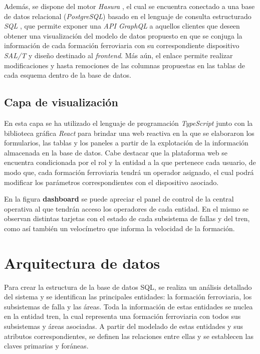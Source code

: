 Además, se dispone del motor \textit{Hasura} \cite{b16}, el cual se encuentra conectado a una base de datos relacional (\textit{PostgreSQL}) basado en el lenguaje de consulta estructurado \textit{SQL} \cite{b17}, que permite exponer una \textit{API GraphQL} \cite{b18} a aquellos clientes que deseen obtener una visualización del modelo de datos propuesto en que se conjuga la información de cada formación ferroviaria con su correspondiente dispositivo \textit{SAL/T} y diseño destinado al \textit{frontend}. Más aún, el enlace permite realizar modificaciones y hasta remociones de las columnas propuestas en las tablas de cada esquema dentro de la base de datos.


\subsection{Capa de visualización}

En esta capa se ha utilizado el lenguaje de programación \textit{TypeScript} \cite{b19} junto con la biblioteca gráfica \textit{React} \cite{b20} para brindar una web reactiva en la que se elaboraron los formularios, las tablas y los paneles a partir de la explotación de la información almacenada en la base de datos. Cabe destacar que la plataforma web se encuentra condicionada por el rol y la entidad a la que pertenece cada usuario, de modo que, cada formación ferroviaria tendrá un operador asignado, el cual podrá modificar los parámetros correspondientes con el dispositivo asociado.

En la figura \textbf{dashboard} se puede apreciar el panel de control de la central operativa al que tendrán acceso los operadores de cada entidad.
En el mismo se observan distintas tarjetas con el estado de cada subsistema de fallas y del tren, como así también un velocímetro que informa la velocidad de la formación.


\section{Arquitectura de datos}

Para crear la estructura de la base de datos SQL, se realiza un análisis detallado del sistema y se identifican las principales entidades: la formación ferroviaria, los subsistemas de falla y las áreas. Toda la información de estas entidades se nuclea en la entidad tren, la cual representa una formación ferroviaria con todos sus subsistemas y áreas asociadas. A partir del modelado de estas entidades y sus atributos correspondientes, se definen las relaciones entre ellas y se establecen las claves primarias y foráneas.


